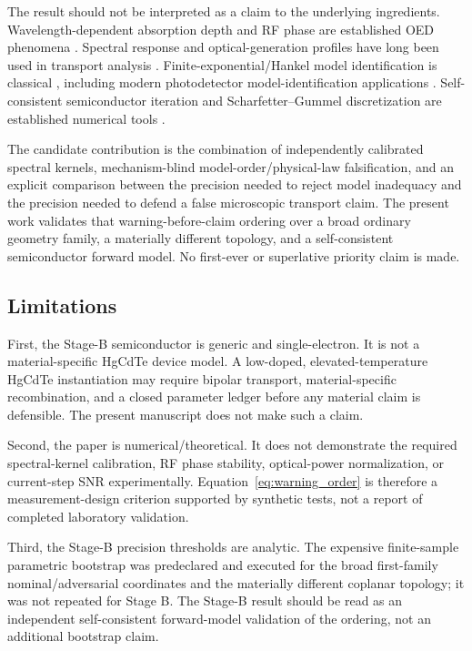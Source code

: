 \documentclass[11pt]{article}
\begin{document}
The result should not be interpreted as a claim to the underlying ingredients. Wavelength-dependent absorption depth and RF phase are established OED phenomena \cite{Glasser2021,Liokumovitch2021,Dutta2024}. Spectral response and optical-generation profiles have long been used in transport analysis \cite{Goodman1961,Geist1980,Halme2008}. Finite-exponential/Hankel model identification is classical \cite{Prony1795,RoyKailath1989,HuaSarkar1990}, including modern photodetector model-identification applications \cite{Sun2025}. Self-consistent semiconductor iteration and Scharfetter--Gummel discretization are established numerical tools \cite{Gummel1964,ScharfetterGummel1969}.

The candidate contribution is the combination of independently calibrated spectral kernels, mechanism-blind model-order/physical-law falsification, and an explicit comparison between the precision needed to reject model inadequacy and the precision needed to defend a false microscopic transport claim. The present work validates that warning-before-claim ordering over a broad ordinary geometry family, a materially different topology, and a self-consistent semiconductor forward model. No first-ever or superlative priority claim is made.

\subsection{Limitations}

First, the Stage-B semiconductor is generic and single-electron. It is not a material-specific HgCdTe device model. A low-doped, elevated-temperature HgCdTe instantiation may require bipolar transport, material-specific recombination, and a closed parameter ledger before any material claim is defensible. The present manuscript does not make such a claim.

Second, the paper is numerical/theoretical. It does not demonstrate the required spectral-kernel calibration, RF phase stability, optical-power normalization, or current-step SNR experimentally. Equation~\eqref{eq:warning_order} is therefore a measurement-design criterion supported by synthetic tests, not a report of completed laboratory validation.

Third, the Stage-B precision thresholds are analytic. The expensive finite-sample parametric bootstrap was predeclared and executed for the broad first-family nominal/adversarial coordinates and the materially different coplanar topology; it was not repeated for Stage B. The Stage-B result should be read as an independent self-consistent forward-model validation of the ordering, not an additional bootstrap claim.
\end{document}
